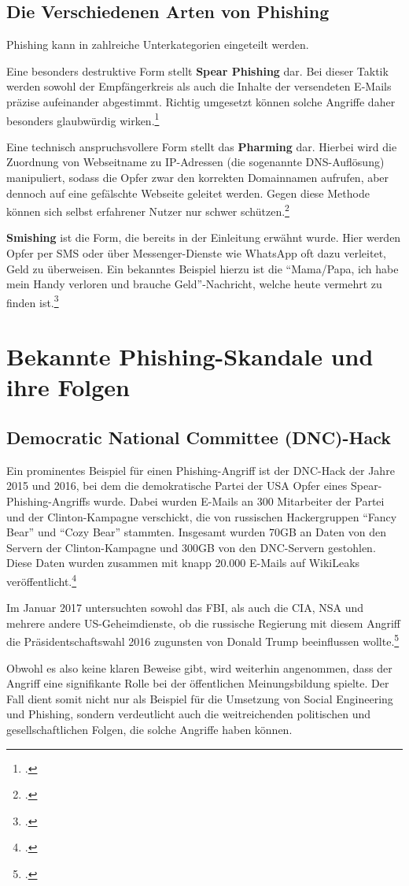 \documentclass[12pt, a4paper, oneside]{scrartcl}
\begin{document}
\subsection{Die Verschiedenen Arten von Phishing}
Phishing kann in zahlreiche Unterkategorien eingeteilt werden. 
\par
Eine besonders destruktive Form stellt \textbf{Spear Phishing} dar. Bei dieser Taktik werden sowohl der Empfängerkreis als auch 
die Inhalte der versendeten E-Mails präzise aufeinander abgestimmt. Richtig umgesetzt können 
solche Angriffe daher besonders glaubwürdig wirken.\footcite{IBM_Phishing}
\par
Eine technisch anspruchsvollere Form stellt das \textbf{Pharming} dar. Hierbei wird die Zuordnung von Webseitname zu 
IP-Adressen (die sogenannte DNS-Auflösung) manipuliert, sodass die Opfer zwar den korrekten Domainnamen aufrufen, aber dennoch auf eine gefälschte
Webseite geleitet werden. Gegen diese Methode können sich selbst erfahrener Nutzer nur schwer schützen.\footcite{Bayern_Phaming}
\par
\textbf{Smishing} ist die Form, die bereits in der Einleitung erwähnt wurde. Hier werden Opfer per SMS oder über 
Messenger-Dienste wie WhatsApp oft dazu verleitet, Geld zu überweisen. Ein bekanntes Beispiel hierzu ist die  
``Mama/Papa, ich habe mein Handy verloren und brauche Geld''-Nachricht, welche heute vermehrt zu finden ist.\footcite{CS_10Arten}\\

\section{Bekannte Phishing-Skandale und ihre Folgen}

\subsection{Democratic National Committee (DNC)-Hack}
Ein prominentes Beispiel für einen Phishing-Angriff ist der DNC-Hack der Jahre 2015 und 2016, 
bei dem die demokratische Partei der USA Opfer eines Spear-Phishing-Angriffs wurde. 
Dabei wurden E-Mails an 300 Mitarbeiter der Partei und der Clinton-Kampagne
verschickt, die von russischen Hackergruppen ``Fancy Bear'' und ``Cozy Bear'' stammten.
Insgesamt wurden 70GB an Daten von den Servern der Clinton-Kampagne und 300GB von den DNC-Servern gestohlen.
Diese Daten wurden zusammen mit knapp 20.000 E-Mails auf WikiLeaks veröffentlicht.\footcite{IDStrong_DNC}
\par
Im Januar 2017 untersuchten sowohl das FBI, als auch die CIA, NSA und mehrere andere US-Geheimdienste, 
ob die russische Regierung mit diesem Angriff die Präsidentschaftswahl 2016 zugunsten von Donald Trump
beeinflussen wollte.\footcite{NYT_DNC}
\par
Obwohl es also keine klaren Beweise gibt, wird weiterhin angenommen, dass der Angriff eine 
signifikante Rolle bei der öffentlichen Meinungsbildung spielte. Der Fall dient somit nicht 
nur als Beispiel für die Umsetzung von Social Engineering und Phishing, sondern verdeutlicht auch die weitreichenden 
politischen und gesellschaftlichen Folgen, die solche Angriffe haben können.
\end{document}

